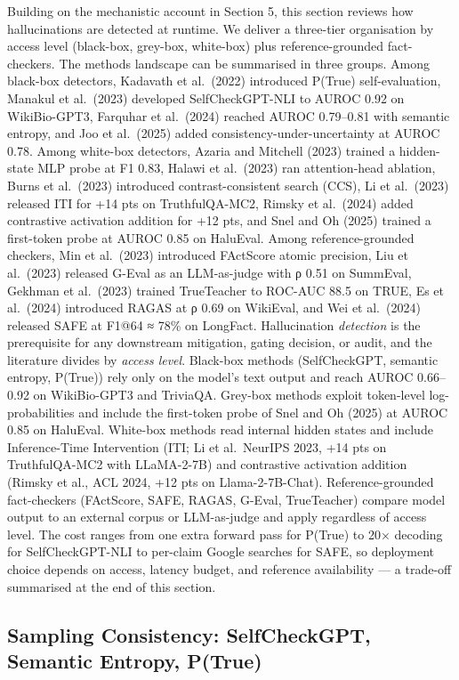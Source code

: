 Building on the mechanistic account in Section 5, this section reviews how hallucinations are detected at runtime. We deliver a three-tier organisation by access level (black-box, grey-box, white-box) plus reference-grounded fact-checkers. The methods landscape can be summarised in three groups. Among black-box detectors, Kadavath et al.~(2022) introduced P(True) self-evaluation, Manakul et al.~(2023) developed SelfCheckGPT-NLI to AUROC 0.92 on WikiBio-GPT3, Farquhar et al.~(2024) reached AUROC 0.79--0.81 with semantic entropy, and Joo et al.~(2025) added consistency-under-uncertainty at AUROC 0.78. Among white-box detectors, Azaria and Mitchell (2023) trained a hidden-state MLP probe at F1 0.83, Halawi et al.~(2023) ran attention-head ablation, Burns et al.~(2023) introduced contrast-consistent search (CCS), Li et al.~(2023) released ITI for +14 pts on TruthfulQA-MC2, Rimsky et al.~(2024) added contrastive activation addition for +12 pts, and Snel and Oh (2025) trained a first-token probe at AUROC 0.85 on HaluEval. Among reference-grounded checkers, Min et al.~(2023) introduced FActScore atomic precision, Liu et al.~(2023) released G-Eval as an LLM-as-judge with ρ 0.51 on SummEval, Gekhman et al.~(2023) trained TrueTeacher to ROC-AUC 88.5 on TRUE, Es et al.~(2024) introduced RAGAS at ρ 0.69 on WikiEval, and Wei et al.~(2024) released SAFE at F1@64 ≈ 78\% on LongFact. Hallucination \emph{detection} is the prerequisite for any downstream mitigation, gating decision, or audit, and the literature divides by \emph{access level}. Black-box methods (SelfCheckGPT, semantic entropy, P(True)) rely only on the model's text output and reach AUROC 0.66--0.92 on WikiBio-GPT3 and TriviaQA. Grey-box methods exploit token-level log-probabilities and include the first-token probe of Snel and Oh (2025) at AUROC 0.85 on HaluEval. White-box methods read internal hidden states and include Inference-Time Intervention (ITI; Li et al.~NeurIPS 2023, +14 pts on TruthfulQA-MC2 with LLaMA-2-7B) and contrastive activation addition (Rimsky et al., ACL 2024, +12 pts on Llama-2-7B-Chat). Reference-grounded fact-checkers (FActScore, SAFE, RAGAS, G-Eval, TrueTeacher) compare model output to an external corpus or LLM-as-judge and apply regardless of access level. The cost ranges from one extra forward pass for P(True) to 20× decoding for SelfCheckGPT-NLI to per-claim Google searches for SAFE, so deployment choice depends on access, latency budget, and reference availability --- a trade-off summarised at the end of this section.

\subsection{Sampling Consistency: SelfCheckGPT, Semantic Entropy, P(True)}\label{sampling-consistency-selfcheckgpt-semantic-entropy-ptrue}

